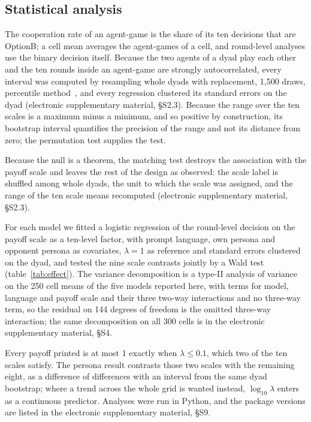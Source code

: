 \documentclass[11pt,a4paper]{article}
\newcommand{\lam}{\lambda}
\begin{document}
\subsection{Statistical analysis}
\label{sec:stats}

The cooperation rate of an agent-game is the share of its ten decisions that are
OptionB; a cell mean averages the agent-games of a cell, and round-level
analyses use the binary decision itself. Because the two agents of a dyad play
each other and the ten rounds inside an agent-game are strongly autocorrelated,
every interval was computed by resampling whole dyads with replacement,
1{,}500 draws, percentile method~\citep{efron1993introduction}, and every
regression clustered its standard errors on the dyad (electronic supplementary
material, \S S2.3).
Because the range over the ten scales is a maximum minus a minimum, and so
positive by construction, its bootstrap interval quantifies the precision of the
range and not its distance from zero; the permutation test supplies the test.

Because the null is a theorem, the matching test destroys the association with
the payoff scale and leaves the rest of the design as observed: the scale label
is shuffled among whole dyads, the unit to which the scale was assigned, and the
range of the ten scale means recomputed (electronic supplementary material,
\S S2.3).

For each model we fitted a logistic regression of the round-level decision on
the payoff scale as a ten-level factor, with prompt language, own persona and
opponent persona as covariates, $\lam = 1$ as reference and standard errors
clustered on the dyad, and tested the nine scale contrasts jointly by a Wald
test (table~\ref{tab:effect}). The variance decomposition is a type-II analysis
of variance on the 250 cell means of the five models reported here, with terms
for model, language and payoff scale and their three two-way interactions and no
three-way term, so the residual on 144 degrees of freedom is the omitted
three-way interaction; the same decomposition on all 300 cells is in the
electronic supplementary material, \S S4.

Every payoff printed is at most 1 exactly when $\lam \leq 0.1$, which two of the
ten scales satisfy. The persona result contrasts those two scales with the
remaining eight, as a difference of differences with an interval from the same
dyad bootstrap; where a trend across the whole grid is wanted instead,
$\log_{10}\lam$ enters as a continuous predictor. Analyses were run in Python,
and the package versions are listed in the electronic supplementary material,
\S S9.
\end{document}
